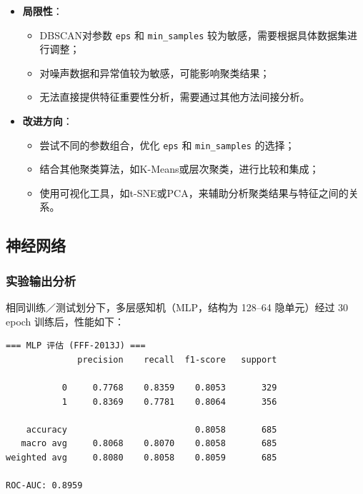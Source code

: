\documentclass{SYSUReport}
\begin{document}
\begin{itemize}
\item \textbf{局限性}：
\begin{itemize}
\item DBSCAN对参数 \texttt{eps} 和 \texttt{min_samples} 较为敏感，需要根据具体数据集进行调整；
\item 对噪声数据和异常值较为敏感，可能影响聚类结果；
\item 无法直接提供特征重要性分析，需要通过其他方法间接分析。
\end{itemize}

\item \textbf{改进方向}：
\begin{itemize}
\item 尝试不同的参数组合，优化 \texttt{eps} 和 \texttt{min_samples} 的选择；
\item 结合其他聚类算法，如K-Means或层次聚类，进行比较和集成；
\item 使用可视化工具，如t-SNE或PCA，来辅助分析聚类结果与特征之间的关系。
\end{itemize}
\end{itemize}

\subsection{神经网络}
\subsubsection{实验输出分析}
相同训练／测试划分下，多层感知机（MLP，结构为 128–64 隐单元）经过 30 epoch 训练后，性能如下：

\begin{verbatim}
=== MLP 评估 (FFF-2013J) ===
              precision    recall  f1-score   support

           0     0.7768    0.8359    0.8053       329
           1     0.8369    0.7781    0.8064       356

    accuracy                         0.8058       685
   macro avg     0.8068    0.8070    0.8058       685
weighted avg     0.8080    0.8058    0.8059       685

ROC-AUC: 0.8959
\end{verbatim}
\end{document}
